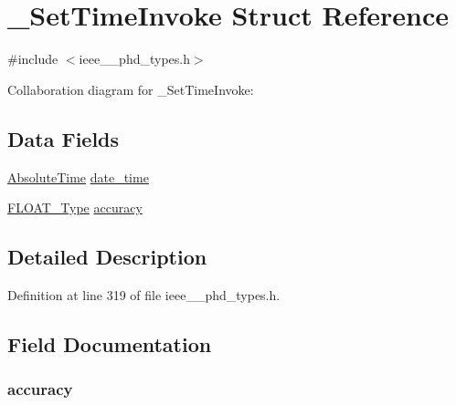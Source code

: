 \hypertarget{struct___set_time_invoke}{}\section{\+\_\+\+Set\+Time\+Invoke Struct Reference}
\label{struct___set_time_invoke}


{\ttfamily \#include $<$ieee\+\_\+\_\+phd\+\_\+types.\+h$>$}



Collaboration diagram for \+\_\+\+Set\+Time\+Invoke\+:
\subsection*{Data Fields}
\begin{DoxyCompactItemize}
\item 
\hyperlink{ieee__11073__phd__types_8h_a1c65bab3ee227fd857096278b0f6ae9a}{Absolute\+Time} \hyperlink{struct___set_time_invoke_a5220206765d190357de8a2604af4c4f4}{date\+\_\+time}
\item 
\hyperlink{ieee__11073__phd__types_8h_af070130e724f8e6babaa500f89591392}{F\+L\+O\+A\+T\+\_\+\+Type} \hyperlink{struct___set_time_invoke_a8e540957e8d16f0438afde27d6e949c1}{accuracy}
\end{DoxyCompactItemize}


\subsection{Detailed Description}


Definition at line 319 of file ieee\+\_\+\_\+phd\+\_\+types.\+h.



\subsection{Field Documentation}
\hypertarget{struct___set_time_invoke_a8e540957e8d16f0438afde27d6e949c1}{}
\subsubsection[{accuracy}]{ accuracy}\label{struct___set_time_invoke_a8e540957e8d16f0438afde27d6e949c1}


